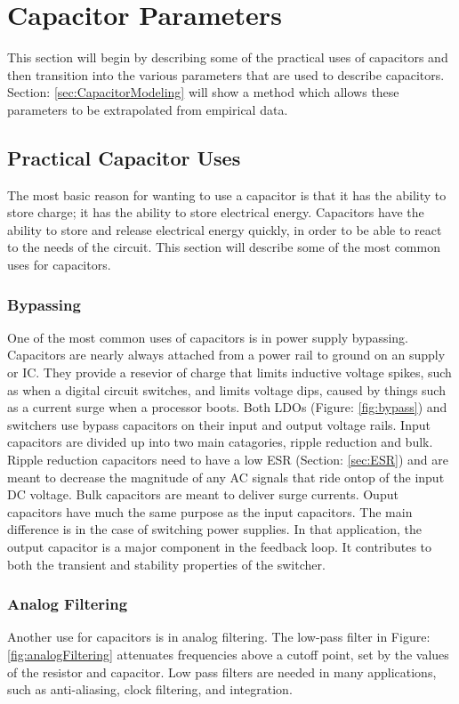 \section {Capacitor Parameters}
This section will begin by describing some of the practical uses of capacitors and then transition into the various parameters that are used to describe capacitors. Section: \ref{sec:CapacitorModeling} will show a method which allows these parameters to be extrapolated from empirical data.

\subsection{Practical Capacitor Uses}

The most basic reason for wanting to use a capacitor is that it has the ability to store charge; it has the ability to store electrical energy. Capacitors have the ability to store and release electrical energy quickly, in order to be able to react to the needs of the circuit. This section will describe some of the most common uses for capacitors.

\subsubsection{Bypassing}


One of the most common uses of capacitors is in power supply bypassing. Capacitors are nearly always attached from a power rail to ground on an supply or IC. They provide a resevior of charge that limits inductive voltage spikes, such as when a digital circuit switches, and limits voltage dips, caused by things such as a current surge when a processor boots.
Both LDOs (Figure: \ref{fig:bypass}) and switchers use bypass capacitors on their input and output voltage rails. Input capacitors are divided up into two main catagories, ripple reduction and bulk. Ripple reduction capacitors need to have a low ESR (Section: \ref{sec:ESR}) and are meant to decrease the magnitude of any AC signals that ride ontop of the input DC voltage. Bulk capacitors are meant to deliver surge currents. Ouput capacitors have much the same purpose as the input capacitors. The main difference is in the case of switching power supplies. In that application, the output capacitor is a major component in the feedback loop. It contributes to both the transient and stability properties of the switcher.

\subsubsection{Analog Filtering}

Another use for capacitors is in analog filtering. The low-pass filter in Figure: \ref{fig:analogFiltering} attenuates frequencies above a cutoff point, set by the values of the resistor and capacitor. Low pass filters are needed in many applications, such as anti-aliasing, clock filtering, and integration.

